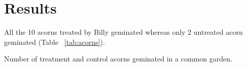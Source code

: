 \documentclass[../main.tex]{article}
\begin{document}
\section{Results}

All the 10 acorns treated by Billy geminated whereas only 2 untreated acorn 
geminated (Table ~\ref{tab:acorns}).


\begin{table}[ht!]
\centering
{}
\caption{Number of treatment and control acorns geminated in a common garden.}
\label{tab:acorns}
\end{table}
\end{document}
